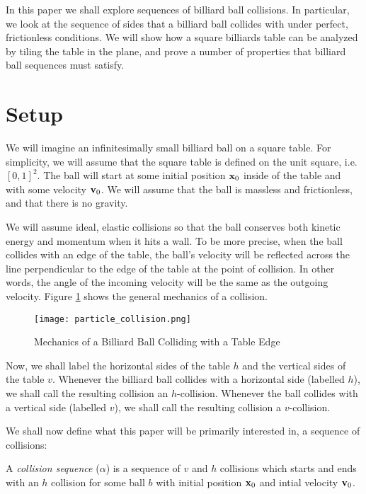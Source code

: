 In this paper we shall explore sequences of billiard ball collisions. In particular, we look at the sequence of sides that a billiard ball collides with under perfect, frictionless conditions. We will show how a square billiards table can be analyzed by tiling the table in the plane, and prove a number of properties that billiard ball sequences must satisfy.

\section{Setup}

We will imagine an infinitesimally small billiard ball on a square table. For simplicity, we will assume that the square table is defined on the unit square, i.e. $[0,1]^2$. The ball will start at some initial position $\mathbf{x}_0$ inside of the table and with some velocity $\mathbf{v}_0$. We will assume that the ball is massless and frictionless, and that there is no gravity.

We will assume ideal, elastic collisions so that the ball conserves both kinetic energy and momentum when it hits a wall. To be more precise, when the ball collides with an edge of the table, the ball's velocity will be reflected across the line perpendicular to the edge of the table at the point of collision. In other words, the angle of the incoming velocity will be the same as the outgoing velocity. Figure \ref{fig:collision-angle} shows the general mechanics of a collision.

\begin{figure}
  \texttt{[image: particle\_collision.png]}
  \caption{\label{fig:collision-angle}Mechanics of a Billiard Ball Colliding with a Table Edge}
\end{figure}

Now, we shall label the horizontal sides of the table $h$ and the vertical sides of the table $v$. Whenever the billiard ball collides with a horizontal side (labelled $h$), we shall call the resulting collision an $h$-collision. Whenever the ball collides with a vertical side (labelled $v$), we shall call the resulting collision a $v$-collision.

We shall now define what this paper will be primarily interested in, a sequence of collisions:

\begin{definition}
  A \emph{collision sequence} ($\alpha$) is a sequence of $v$ and $h$ collisions which starts and ends with an $h$ collision for some ball $b$ with initial position $\mathbf{x}_0$ and intial velocity $\mathbf{v}_0$.
\end{definition}

